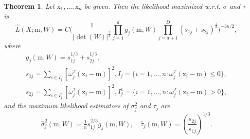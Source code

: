 \documentclass[12pt]{article}
\def\w{\omega}
\def\x{\mathrm{x}}
\def\m{\mathrm{m}}
\newtheorem{theorem}{Theorem}[section]
\theoremstyle{definition}
\begin{document}
\begin{theorem}\label{theII:min}
Let $\x_1,\ldots,\x_n$ be given.  
Then the likelihood maximized w.r.t. $\sigma$ and $\tau$ is
\begin{equation}\label{eqII:1}
 \hat{L}(X;\m,W) = C \bigg( \frac{1}{|\det(W)|^{\frac{2}{3}}} \prod_{j=1}^{d} g_{j}(\m,W) \prod_{j=d+1}^{D} (s_{1j}+s_{2j})^{\frac{1}{3}} \bigg)^{-3n/2},
\end{equation}
where
$$
\begin{array}{c}
{g}_{j}(\m,W) = {s}_{1j}^{1/3} + {s}_{2j}^{1/3},
\\[1ex]
{s}_{1j}= \! \sum\limits_{i \in I_j}[ \w_{j}^T (\x_i-\m)]^2,  {I}_j=\{ i = 1,\ldots,n \colon \w_{j}^T (\x_i-\m) \leq 0 \},
\\[1ex]
{s}_{2j}= \! \sum\limits_{i \in I_j^c}[ \w_{j}^T (\x_i-\m)]^2, {I}_j^c=\{ i = 1,\ldots,n \colon  \w_{j}^T (\x_i-\m) > 0 \},
\end{array}
$$
and the maximum likelihood estimators of $\sigma_{j}^2$ and $\tau_{j}$ are
$$\hat \sigma_j^2(\m,W) = \tfrac{1}{n} s_{1j}^{2/3} g_{j}(\m,W), \quad
\hat \tau_{j}(\m,W)=\left(\frac{s_{2j}}{s_{1j}}\right)^{1/3}.
$$
\end{theorem}
\end{document}
